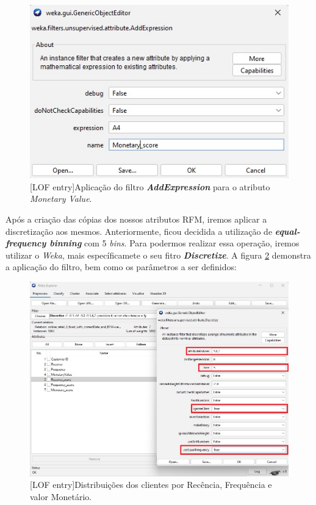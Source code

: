 \documentclass{easychair}
\begin{document}
 \begin{figure}[H]
    \begin{centering}
    \includegraphics[width=0.5\linewidth]{imagens/figure14.jpg}\label{cap-3-fig14}
    [LOF entry]{Aplicação do filtro \textit{\textbf{AddExpression}} para o atributo \textit{Monetary Value}.}
    \label{fig14}
    \end{centering}
\end{figure}

Após a criação das cópias dos nossos atributos RFM, iremos aplicar a discretização aos mesmos. Anteriormente, ficou decidida a utilização de \textit{\textbf{equal-frequency binning}} com 5 \textit{bins}. Para podermos realizar essa operação, iremos utilizar o \textit{Weka}, mais específicamete o seu fitro \textit{\textbf{Discretize}}. A figura \ref{fig7} demonstra a aplicação do filtro, bem como os parâmetros a ser definidos:

 \begin{figure}[H]
    \begin{centering}
    \includegraphics[width=1\linewidth]{imagens/figure7.jpg}\label{cap-4-fig7}
    [LOF entry]{Distribuições dos clientes por Recência, Frequência e valor Monetário.}
    \label{fig7}
    \end{centering}
\end{figure}
\end{document}
